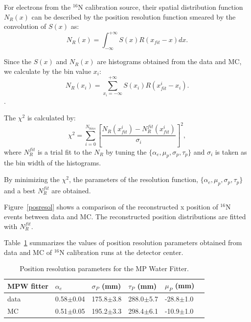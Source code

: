 For electrons from the $^{16}$N calibration source, their spatial distribution function $N_{R}(x)$ can be described by the position resolution function smeared by the convolution of $S(x)$ as\cite{boulay}:
\[
N_{R}(x)=\int^{+\infty}_{-\infty} S(x)R(x_{fit}-x)dx.
\]

Since the $S(x)$ and $N_{R}(x)$ are histograms obtained from the data and MC, we calculate by the bin value $x_i$: 
\[N_R(x_i)=\sum_{x_i=-\infty}^{+\infty}S(x_i)R(x_{fit}^i-x_i).\].

The $\chi^2$ is calculated by:
\[
\chi^2=\sum^{N_{bins}}_{i=0}[\frac{N_R(x_{fit}^i)-N_R^{fit}(x_{fit}^i)}{\sigma_i}]^2,
\]
where $N_R^{fit}$ is a trial fit to the $N_R$ by tuning the $\{\alpha_e,\mu_p,\sigma_p,\tau_p\}$ and $\sigma_i$ is taken as the bin width of the histograms.

By minimizing the $\chi^2$, the parameters of the resolution function, $\{\alpha_e,\mu_p,\sigma_p,\tau_p\}$ and a best $N_R^{fit}$ are obtained.

Figure~\ref{posresol} shows a comparison of the reconstructed x position of {$^{16}$}N events between data and MC. The reconstructed position distributions are fitted with $N_R^{fit}$.


Table~\ref{table_posresol} summarizes the values of position resolution parameters obtained from data and MC of {$^{16}$}N calibration runs at the detector center.
\vspace{1mm}
\begin{table}[ht]
	\centering
	\caption{Position resolution parameters for the MP Water Fitter.}
	\label{table_posresol}
	\begin{tabular}{|p{2.5cm}|p{2.2cm}|p{2.1cm}|p{2.1cm}|p{2.1cm}| p{2.1cm}|}
		\hline
		MPW fitter & $\alpha_e$ & $\sigma_P$ (mm) &  $\tau_P$ (mm)& $\mu_P$ (mm)\\
		\hline 
		data& 0.58$\pm$0.04 & 175.8$\pm$3.8 & 288.0$\pm$5.7 & -28.8$\pm$1.0\\	
		\hline 
		MC & 0.51$\pm$0.05 & 195.2$\pm$3.3 & 298.4$\pm$6.1 & -10.9$\pm$1.0\\
		\hline
	\end{tabular}
\end{table}
\vspace{1mm}

